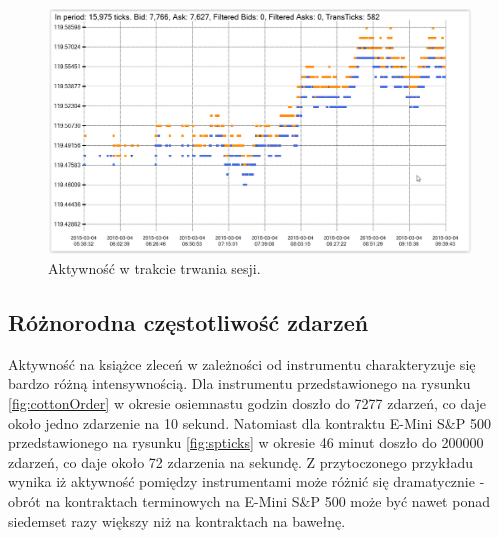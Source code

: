 \documentclass[a4paper,12pt,openany, DIV=calc, headsepline]{scrbook}
\begin{document}
\begin{figure}[H]
  \centering
  \includegraphics[scale=0.5]{wykresy/vol1.PNG}
  \caption{Aktywność w trakcie trwania sesji.}
  \label{fig:volM}
\end{figure}

\subsection{Różnorodna częstotliwość zdarzeń}

Aktywność na książce zleceń w zależności od instrumentu charakteryzuje się bardzo różną intensywnością. Dla instrumentu przedstawionego na rysunku \ref{fig:cottonOrder} w okresie osiemnastu godzin doszło do 7277 zdarzeń, co daje około jedno zdarzenie na 10 sekund. Natomiast dla kontraktu E-Mini S\&P 500 przedstawionego na rysunku \ref{fig:spticks} w okresie 46 minut doszło do 200000 zdarzeń, co daje około 72 zdarzenia na sekundę. Z przytoczonego przykładu wynika iż aktywność pomiędzy instrumentami może różnić się dramatycznie - obrót na kontraktach terminowych na E-Mini S\&P 500 może być nawet ponad siedemset razy większy niż na kontraktach na bawełnę.
\end{document}
